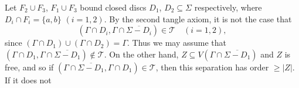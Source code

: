 Let $F_2 \cup F_3$, $F_1 \cup F_3$ bound closed discs $D_1$, $D_2 \subseteq \Sigma$ respectively, where $D_i \cap F_i = \{a, b\}$ $(i = 1, 2)$. By the second tangle axiom, it is not the case that
\begin{equation*}
(\Gamma \cap D_i, \Gamma \cap \overline{\Sigma - D_i}) \in \mathscr{T} \quad (i = 1, 2),
\end{equation*}
since $(\Gamma \cap D_1) \cup (\Gamma \cap D_2) = \Gamma$. Thus we may assume that $(\Gamma \cap D_1, \Gamma \cap \overline{\Sigma - D_1}) \notin \mathscr{T}$. On the other hand, $Z \subseteq V(\Gamma \cap \overline{\Sigma - D_1})$ and $Z$ is free, and so if $(\Gamma \cap \overline{\Sigma - D_1}, \Gamma \cap D_1) \in \mathscr{T}$, then this separation has order $\ge |Z|$. If it does not
